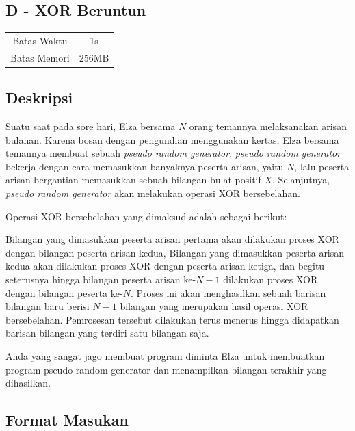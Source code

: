 \documentclass{article}
\begin{document}
\begin{center}
    \section*{D - XOR Beruntun} %

    \begin{tabular}{ | c c | }
        \hline
        Batas Waktu  & 1s \\    %
        Batas Memori & 256MB \\  %
        \hline
    \end{tabular}
\end{center}

\subsection*{Deskripsi}

Suatu saat pada sore hari, Elza bersama $N$ orang temannya melaksanakan arisan bulanan.
Karena bosan dengan pengundian menggunakan kertas, Elza bersama temannya membuat sebuah \textit{pseudo random generator}.
\textit{pseudo random generator} bekerja dengan cara memasukkan banyaknya peserta arisan, yaitu $N$, lalu peserta arisan bergantian memasukkan sebuah bilangan bulat positif $X$.
Selanjutnya, \textit{pseudo random generator} akan melakukan operasi XOR bersebelahan.

Operasi XOR bersebelahan yang dimaksud adalah sebagai berikut:

Bilangan yang dimasukkan peserta arisan pertama akan dilakukan proses XOR dengan bilangan peserta arisan kedua, 
Bilangan yang dimasukkan peserta arisan kedua akan dilakukan proses XOR dengan peserta arisan ketiga, 
dan begitu seterusnya hingga bilangan peserta arisan ke-$N - 1$ dilakukan proses XOR dengan bilangan peserta ke-$N$. Proses ini akan menghasilkan sebuah barisan bilangan baru berisi $N - 1$ bilangan yang merupakan hasil operasi XOR bersebelahan. 
Pemrosesan tersebut dilakukan terus menerus hingga didapatkan barisan bilangan yang terdiri satu bilangan saja.

Anda yang sangat jago membuat program diminta Elza untuk membuatkan program pseudo random generator dan menampilkan bilangan terakhir yang dihasilkan.

\subsection*{Format Masukan}
\end{document}

